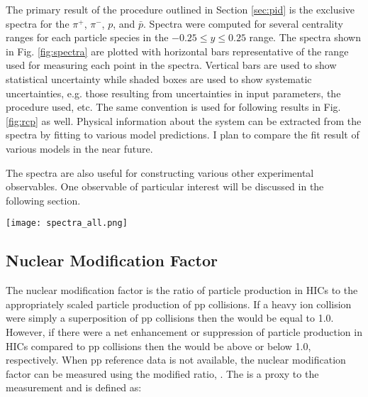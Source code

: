 	The primary result of the procedure outlined in Section \ref{sec:pid} is the exclusive spectra for the $\pi^+$, $\pi^-$, $p$, and $\bar{p}$. Spectra were computed for several centrality ranges for each particle species in the $-0.25 \leq y \leq 0.25$ range. The spectra shown in Fig. \ref{fig:spectra} are plotted with horizontal bars representative of the \pt range used for measuring each point in the spectra. Vertical bars are used to show statistical uncertainty while shaded boxes are used to show systematic uncertainties, e.g. those resulting from uncertainties in input parameters, the procedure used, etc. The same convention is used for following results in Fig. \ref{fig:rcp} as well. Physical information about the system can be extracted from the spectra by fitting to various model predictions. I plan to compare the fit result of various models in the near future.

	The spectra are also useful for constructing various other experimental observables. One observable of particular interest will be discussed in the following section.

	\begin{sidewaysfigure}[ht]
		\centering 
		\texttt{[image: spectra\_all.png]} 

		\centering
		\caption{ \label{fig:spectra} The normalized and corrected exclusive particle yields in the rapidity range $-0.25 \leq y \leq 0.25 $ for positive pions (top left), negative pions (bottom left), protons (top right), and anti-protons (bottom right). The spectra for each centrality is shown in a different color and scaled by successive factors of 10 for viewing purposes. Horizontal bars represent the \pt range used for measuring each point in the spectra. Vertical bars are used to show statistical uncertainty while shaded boxes are used to show systematic uncertainties, ie those resulting from uncertainties in input parameters, the procedure used, etc. } 
	\end{sidewaysfigure}

	\subsection{Nuclear Modification Factor}
	\label{sec:rcp}
	The nuclear modification factor \raa is the ratio of particle production in HICs to the appropriately scaled particle production of pp collisions. If a heavy ion collision were simply a superposition of pp collisions then the \raa would be equal to 1.0. However, if there were a net enhancement or suppression of particle production in HICs compared to pp collisions then the \raa would be above or below 1.0, respectively. When pp reference data is not available, the nuclear modification factor can be measured using the modified ratio, \rcp. The \rcp is a proxy to the \raa measurement and is defined as:

